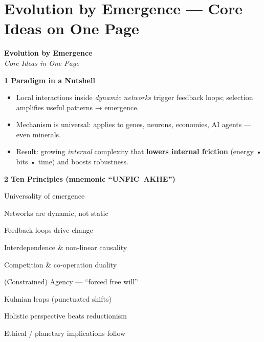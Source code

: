 
\chapter*{Evolution by Emergence — Core Ideas on One Page}

\begin{center}
  {\Large\bfseries Evolution by Emergence}\\[2pt]
  \emph{Core Ideas in One Page}
\end{center}

\bigskip
\noindent\textbf{1\; Paradigm in a Nutshell}\par
\begin{itemize}[leftmargin=*]
  \item Local interactions inside \emph{dynamic networks} trigger feedback loops; selection amplifies useful patterns → emergence.
  \item Mechanism is universal: applies to genes, neurons, economies, AI agents — even minerals.
  \item Result: growing \emph{internal} complexity that \textbf{lowers internal friction} (energy • bits • time) and boosts robustness.
\end{itemize}

\medskip
\noindent\textbf{2\; Ten Principles (mnemonic “UNFIC AKHE”)}\par
\begin{description}[leftmargin=2.4em,labelwidth=1.8em]
  \item[U] Universality of emergence
  \item[N] Networks are dynamic, not static
  \item[F] Feedback loops drive change
  \item[I] Interdependence \& non‑linear causality
  \item[C] Competition \& co‑operation duality
  \item[A] (Constrained) Agency — “forced free will”
  \item[K] Kuhnian leaps (punctuated shifts)
  \item[H] Holistic perspective beats reductionism
  \item[E] Ethical / planetary implications follow
\end{description}

